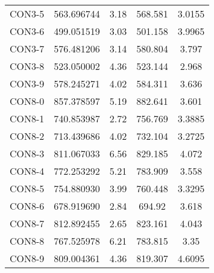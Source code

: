 \begin{table}[ht]
\begin{tabular}{c c c c c}
CON3-5 & 563.696744 & 3.18 & 568.581 & 3.0155 \\
CON3-6 & 499.051519 & 3.03 & 501.158 & 3.9965 \\
CON3-7 & 576.481206 & 3.14 & 580.804 & 3.797 \\
CON3-8 & 523.050002 & 4.36 & 523.144 & 2.968 \\
CON3-9 & 578.245271 & 4.02 & 584.311 & 3.636 \\
CON8-0 & 857.378597 & 5.19 & 882.641 & 3.601 \\
CON8-1 & 740.853987 & 2.72 & 756.769 & 3.3885 \\
CON8-2 & 713.439686 & 4.02 & 732.104 & 3.2725 \\
CON8-3 & 811.067033 & 6.56 & 829.185 & 4.072 \\
CON8-4 & 772.253292 & 5.21 & 783.909 & 3.558 \\
CON8-5 & 754.880930 & 3.99 & 760.448 & 3.3295 \\
CON8-6 & 678.919690 & 2.84 & 694.92 & 3.618 \\
CON8-7 & 812.892455 & 2.65 & 823.161 & 4.043 \\
CON8-8 & 767.525978 & 6.21 & 783.815 & 3.35 \\
CON8-9 & 809.004361 & 4.36 & 819.307 & 4.6095 \\
[1ex]\hline
\end{tabular}
\label{table:nonlin}
\end{table} \clearpage
